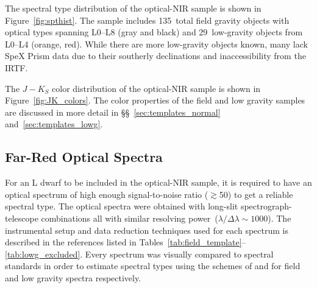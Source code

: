 \documentclass[12pt,preprint]{aastex}
\newcommand{\optNormal}{135}
\newcommand{\optLowG}{29}
\begin{document}
The spectral type distribution of the optical-NIR sample is shown in Figure~\ref{fig:spthist}. 
The sample includes \optNormal~total field gravity objects with optical types spanning L0--L8 (gray and black)
and \optLowG~low-gravity objects from L0--L4 (orange, red). 
While there are more low-gravity objects known, many lack SpeX Prism data due to their southerly declinations and inaccessibility from the IRTF.

The $J-K_S$ color distribution of the optical-NIR sample is shown in Figure~\ref{fig:JK_colors}. 
The color properties of the field and low gravity samples are discussed in more detail in \S\S~\ref{sec:templates_normal} and~\ref{sec:templates_lowg}.

\subsection{Far-Red Optical Spectra}

For an L dwarf to be included in the optical-NIR sample, it is required to have an optical spectrum of high enough signal-to-noise ratio ($\gtrsim$50) to get a reliable spectral type.
The optical spectra were obtained with long-slit spectrograph-telescope combinations all with similar resolving power~($\lambda/\Delta\lambda\sim1000$). 
The instrumental setup and data reduction techniques used for each spectrum is described in the references listed in Tables~\ref{tab:field_template}--\ref{tab:lowg_excluded}.
Every spectrum was visually compared to spectral standards in order to estimate spectral types using the schemes of \citet{K99} and \cite{Cruz09_lowg} for field and low gravity spectra respectively.  


\end{document}
